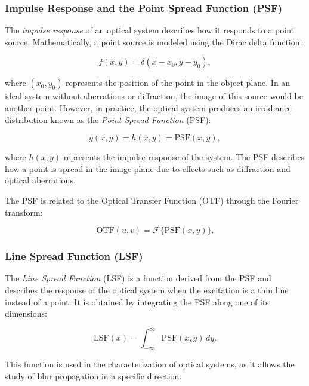 \subsubsection{Impulse Response and the Point Spread Function (PSF)}

The \textit{impulse response} of an optical system describes how it responds to a point source. Mathematically, a point source is modeled using the Dirac delta function:

\begin{equation}
f(x,y) = \delta(x - x_0, y - y_0),
\end{equation}

where $(x_0, y_0)$ represents the position of the point in the object plane. In an ideal system without aberrations or diffraction, the image of this source would be another point. However, in practice, the optical system produces an irradiance distribution known as the \textit{Point Spread Function} (PSF):

\begin{equation}
g(x,y) = h(x,y) = \text{PSF}(x,y),
\end{equation}

where $h(x,y)$ represents the impulse response of the system. The PSF describes how a point is spread in the image plane due to effects such as diffraction and optical aberrations.

The PSF is related to the Optical Transfer Function (OTF) through the Fourier transform:

\begin{equation}
\text{OTF}(u,v) = \mathcal{F} \{ \text{PSF}(x,y) \}.
\end{equation}

\subsubsection{Line Spread Function (LSF)}

The \textit{Line Spread Function} (LSF) is a function derived from the PSF and describes the response of the optical system when the excitation is a thin line instead of a point. It is obtained by integrating the PSF along one of its dimensions:

\begin{equation}
\text{LSF}(x) = \int_{-\infty}^{\infty} \text{PSF}(x,y) \, dy.
\end{equation}

This function is used in the characterization of optical systems, as it allows the study of blur propagation in a specific direction.

